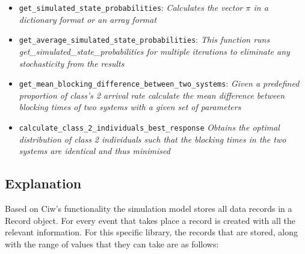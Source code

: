 \begin{itemize}
    {get_mean_proportion_of_individuals_within_target_for_multiple_runs}: 
    \textit{Get the average proportion of individuals within target by running 
    the simulation multiple times}
    \item \lstinline[style=pystyle]{get_simulated_state_probabilities}: \textit{
    Calculates the vector \(\pi\) in a dictionary format or an array format}
    \item \lstinline[style=pystyle]{get_average_simulated_state_probabilities}:
    \textit{This function runs \hfill\break
    get\_simulated\_state\_probabilities for multiple iterations to eliminate 
    any stochasticity from the results}
    \item \lstinline[style=pystyle]
    {get_mean_blocking_difference_between_two_systems}: \textit{Given a 
    predefined proportion of class's 2 arrival rate calculate the mean 
    difference between blocking times of two systems with a given set of 
    parameters}
    \item \lstinline[style=pystyle]{calculate_class_2_individuals_best_response}
    \textit{Obtains the optimal distribution of class 2 individuals such that 
    the blocking times in the two systems are identical and thus minimised}
\end{itemize}



\subsection{Explanation}

Based on Ciw's functionality the simulation model stores all data records in a
Record object. 
For every event that takes place a record is created with all the relevant
information.
For this specific library, the records that are stored, along with the 
range of values that they can take are as follows:

